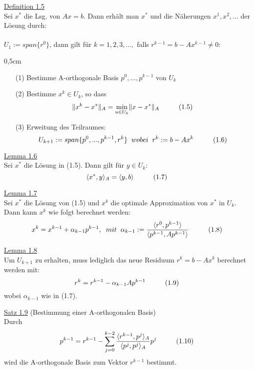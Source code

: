 \documentclass[a4paper]{letter}
\begin{document}
\underline{Definition 1.5}
\\Sei $x^{*}$ die Lsg. von $Ax = b$. Dann erh\"alt man $x^{*}$ und die N\"aherungen $x^{1}, x^{2},...$ der L\"osung durch:
\\\\$U_{1} := span\{r^{0}\}$, dann gilt f\"ur $k = 1,2,3,...,$ falls $r^{k-1} = b - Ax^{k-1} \ne 0$:
\begin{addmargin}[0,5cm]{0,5cm}
\begin{itemize}
\item[(1)]Bestimme A-orthogonale Basis $p^{0},...,p^{k-1}$ von $U_{k}$
\item[(2)]Bestimme $x^{k} \in U_{k}$, so dass
$$\|x^{k} - x^{*}\|_{A} = \underset{u \in U_{k}}{\min} \|x - x^{*}\|_{A} \hspace{10mm} (1.5)$$
\item[(3)]Erweitung des Teilraumes:
$$U_{k+1} := span\{p^{0},...,p^{k-1},r^{k}\} \hspace{2mm} wobei \hspace{2mm} r^{k} := b - Ax^{k} \hspace{10mm} (1.6)$$
\end{itemize}
\end{addmargin}

\underline{Lemma 1.6}
\\Sei $x^{*}$ die L\"osung in (1.5). Dann gilt f\"ur $y \in U_{k}$:
$$\langle x^{*}, y \rangle _{A} = \langle y, b \rangle \hspace{10mm} (1.7)$$

\underline{Lemma 1.7}
\\Sei $x^{*}$ die L\"osung von (1.5) und $x^{k}$ die optimale Approximation von $x^{*}$ in $U_{k}$. Dann kann $x^{k}$ wie folgt berechnet werden:
$$x^{k} = x^{k-1} + \alpha_{k-1}p^{k-1}, \hspace{2mm} mit \hspace{2mm} \alpha_{k-1} := \frac {\langle r^{0}, p^{k-1} \rangle} {\langle {p^{k-1}, Ap^{k-1}} \rangle} \hspace{10mm} (1.8)$$

\underline{Lemma 1.8}
\\Um $U_{k+1}$ zu erhalten, muss lediglich das neue Residuum $r^{k} = b - Ax^{k}$ berechnet werden mit:
$$r^{k} = r^{k-1} - \alpha_{k-1}Ap^{k-1} \hspace{10mm} (1.9)$$
wobei $\alpha_{k-1}$ wie in (1.7).

\underline{Satz 1.9} (Bestimmung einer A-orthogonalen Basis)
\\Durch
$$p^{k-1} = r^{k-1} - \sum_{j=0}^{k-2} \frac {\langle r^{k-1}, p^{j} \rangle _{A}} {\langle p^{j}, p^{j} \rangle _{A}} p^{j} \hspace{10mm} (1.10)$$
wird die A-orthogonale Basis zum Vektor $r^{k-1}$ bestimmt.
\end{document}
